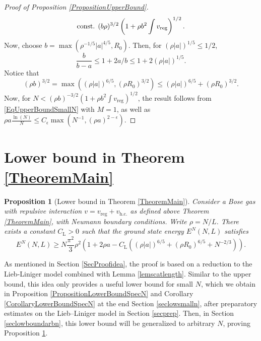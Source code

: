 \documentclass[a4paper,11pt]{article}
\newcommand{\abs}[1]{\left\lvert #1 \right\rvert}
\newtheorem{proposition}[theorem]{Proposition}
\numberwithin{equation}{section}
\begin{document}
\begin{proof}[Proof of Proposition \ref{PropositionUpperBound}]
\begin{equation}
			\text{const. }(b\rho)^{3/2}\left(1+\rho b^2 \int v_{\textnormal{reg}}\right)^{1/2}.
		\end{equation}
		Now, choose $ b=\max(\rho^{-1/5}\abs{a}^{4/5},R_0) $. Then, for $(\rho \abs{a})^{1/5}\leq 1/2$, 
		\begin{equation}
			\frac{b}{b-a}\leq1+2a/b\leq  1+2(\rho\abs{a})^{1/5}.
		\end{equation}
		Notice that
		\begin{equation}(\rho b)^{3/2}= \max\left((\rho \abs{a})^{6/5},(\rho R_0)^{3/2}\right)\leq  (\rho \abs{a})^{6/5}+(\rho R_0)^{3/2}. 
		\end{equation}
		Now, for $ N<(\rho b)^{-3/2}\left(1+\rho b^2\int v_{\text{reg}}\right)^{1/2} $, the result follows from \eqref{EqUpperBoundSmallN} with $M=1$, as well as $\rho a \frac{\ln(N)}{N}\leq  C_\epsilon\max (N^{-1},(\rho a)^{2-\epsilon} )$.
	\end{proof}
	
	\section{Lower bound in Theorem \ref{TheoremMain}}	
	\label{SecLowerbound}
	\begin{proposition}[Lower bound in Theorem \ref{TheoremMain}]
		\label{PropositionLowerBound}
		Consider a Bose gas with repulsive interaction  $v=v_{\text{reg}}+v_{\text{h.c.}}$ as defined above Theorem \ref{TheoremMain}, with Neumann boundary conditions. Write $\rho=N/L$. There exists a constant $C_\text{L}>0$ such that the ground state energy $E^N(N,L)$ satisfies
		\begin{equation}
			\label{eqlower}
			E^N(N,L)\geq N\frac{\pi^2}{3}\rho^2\left(1+2\rho a-C_\text{L}\left((\rho\abs{a})^{6/5}+(\rho R_0)^{6/5}+N^{-2/3}\right)\right).
		\end{equation}
	\end{proposition}
	As mentioned in Section \ref{SecProofidea}, the proof is based on a reduction to the Lieb-Liniger model combined with Lemma \ref{lemscatlength}. Similar to the upper bound, this idea only provides a useful lower bound for small $N$, which we obtain in Proposition \ref{PropositionLowerBoundSpecN} and Corollary \ref{CorollaryLowerBoundSpecN} at the end Section \ref{seclowsmalln}, after preparatory estimates on the Lieb--Liniger model in Section \ref{secprep}. Then, in Section \ref{seclowboundarbn}, this lower bound will be generalized to arbitrary $N$, proving Proposition \ref{PropositionLowerBound}.
	
\end{document}
